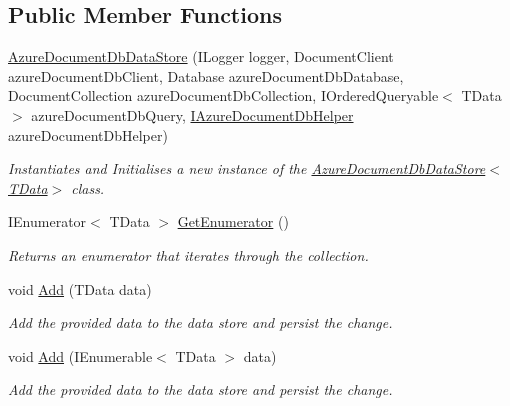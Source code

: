 \subsection*{Public Member Functions}
\begin{DoxyCompactItemize}
\item 
\hyperlink{classCqrs_1_1Azure_1_1DocumentDb_1_1DataStores_1_1AzureDocumentDbDataStore_add3f66df634a9e9ca0cbd4498e4478f6_add3f66df634a9e9ca0cbd4498e4478f6}{Azure\+Document\+Db\+Data\+Store} (I\+Logger logger, Document\+Client azure\+Document\+Db\+Client, Database azure\+Document\+Db\+Database, Document\+Collection azure\+Document\+Db\+Collection, I\+Ordered\+Queryable$<$ T\+Data $>$ azure\+Document\+Db\+Query, \hyperlink{interfaceCqrs_1_1Azure_1_1DocumentDb_1_1IAzureDocumentDbHelper}{I\+Azure\+Document\+Db\+Helper} azure\+Document\+Db\+Helper)
\begin{DoxyCompactList}\small\item\em Instantiates and Initialises a new instance of the \hyperlink{classCqrs_1_1Azure_1_1DocumentDb_1_1DataStores_1_1AzureDocumentDbDataStore_add3f66df634a9e9ca0cbd4498e4478f6_add3f66df634a9e9ca0cbd4498e4478f6}{Azure\+Document\+Db\+Data\+Store$<$\+T\+Data$>$} class. \end{DoxyCompactList}\item 
I\+Enumerator$<$ T\+Data $>$ \hyperlink{classCqrs_1_1Azure_1_1DocumentDb_1_1DataStores_1_1AzureDocumentDbDataStore_af83791e306b51fd3ee0b710232e83756_af83791e306b51fd3ee0b710232e83756}{Get\+Enumerator} ()
\begin{DoxyCompactList}\small\item\em Returns an enumerator that iterates through the collection. \end{DoxyCompactList}\item 
void \hyperlink{classCqrs_1_1Azure_1_1DocumentDb_1_1DataStores_1_1AzureDocumentDbDataStore_ad17e6e846430e617af24be48b77d1528_ad17e6e846430e617af24be48b77d1528}{Add} (T\+Data data)
\begin{DoxyCompactList}\small\item\em Add the provided {\itshape data}  to the data store and persist the change. \end{DoxyCompactList}\item 
void \hyperlink{classCqrs_1_1Azure_1_1DocumentDb_1_1DataStores_1_1AzureDocumentDbDataStore_a2d91050f17273687e44a121623803e7a_a2d91050f17273687e44a121623803e7a}{Add} (I\+Enumerable$<$ T\+Data $>$ data)
\begin{DoxyCompactList}\small\item\em Add the provided {\itshape data}  to the data store and persist the change. \end{DoxyCompactList}\item 

\end{DoxyCompactItemize}
